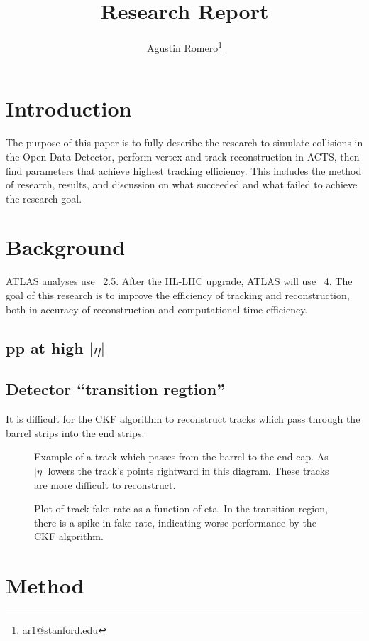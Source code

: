 \documentclass{article}
\title{Research Report}
\author{Agustin Romero\thanks{ar1@stanford.edu}}
\newcommand{\pic}[2]{\beg{center}{\texttt{[image: \#2]}}}
\newcommand{\figpic}[3]{
\begin{figure}[H]
\begin{center}
\pic{#1}{#2}
\caption{#3}
\end{center}
\end{figure}}
\begin{document}
\maketitle

\section{Introduction}

The purpose of this paper is to fully describe the research to simulate \ttbar collisions in the Open Data Detector, perform vertex and track reconstruction in ACTS, then find parameters that achieve highest tracking efficiency. This includes the method of research, results, and discussion on what succeeded and what failed to achieve the research goal.

\section{Background}

ATLAS analyses use \abseta~2.5. After the HL-LHC upgrade, ATLAS will use \abseta~4. The goal of this research is to improve the efficiency of tracking and reconstruction, both in accuracy of reconstruction and computational time efficiency.

\subsection{pp at high $|\eta|$}

\subsection{Detector ``transition regtion''}

It is difficult for the CKF algorithm to reconstruct tracks which pass through the barrel strips into the end strips.

\figpic{5cm}{2.png}{Example of a track which passes from the barrel to the end cap. As $|\eta|$ lowers the track's points rightward in this diagram. These tracks are more difficult to reconstruct.}

\figpic{5cm}{3.png}{Plot of track fake rate as a function of eta. In the transition region, there is a spike in fake rate, indicating worse performance by the CKF algorithm.}

\section{Method}
\end{document}
